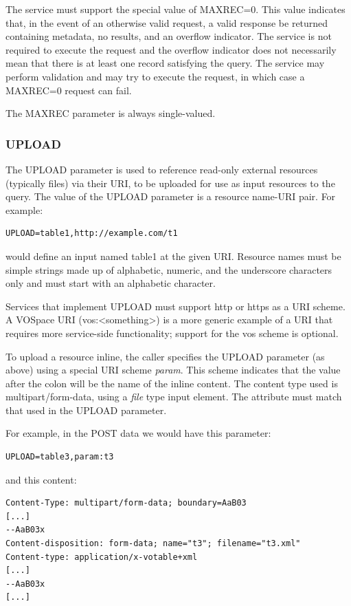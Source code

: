 \documentclass[11pt,letter]{ivoa}
\begin{document}
The service must support the special value of MAXREC=0. This value indicates
that, in the event of an otherwise valid request, a valid response be returned
containing metadata, no results, and an overflow indicator. The
service is not required to execute the request and the overflow indicator does
not necessarily mean that there is at least one record satisfying the query. The
service may perform validation and may try to execute the request, in which case
a MAXREC=0 request can fail.

The MAXREC parameter is always single-valued.

\subsubsection{UPLOAD}
\label{sec:UPLOAD}
The UPLOAD parameter is used to reference read-only external resources
(typically files) via their URI, to be uploaded for use as input resources to
the query. The value of the UPLOAD parameter is a resource name-URI pair. For
example:

\begin{verbatim}
UPLOAD=table1,http://example.com/t1
\end{verbatim}

would define an input named table1 at the given URI. Resource names must be
simple strings made up of alphabetic, numeric, and the underscore characters
only and must start with an alphabetic character.

Services that implement UPLOAD must support http or https as a URI scheme.
A VOSpace URI (vos:<something>)  is a
more generic example of a URI that requires more service-side functionality;
support for the vos scheme is optional.

To upload a resource inline, the caller specifies the UPLOAD parameter (as
above) using a special URI scheme \emph{param}. This scheme indicates that the value
after the colon will be the name of the inline content. The content type used is
multipart/form-data, using a \emph{file} type input element. The  attribute
must match that used in the UPLOAD parameter.

For example, in the POST data we would have this parameter:

\begin{verbatim}
UPLOAD=table3,param:t3
\end{verbatim}

and this content:

\begin{verbatim}
Content-Type: multipart/form-data; boundary=AaB03
[...]
--AaB03x
Content-disposition: form-data; name="t3"; filename="t3.xml"
Content-type: application/x-votable+xml
[...]
--AaB03x
[...]
\end{verbatim}
\end{document}
